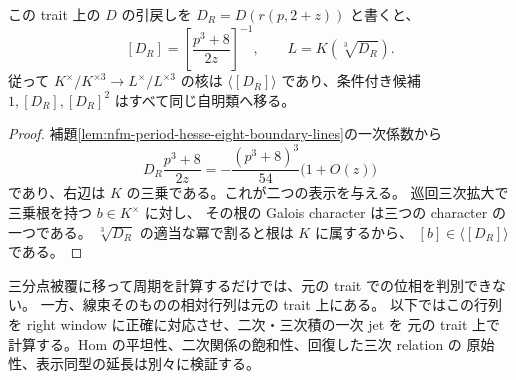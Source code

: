 \begin{corollary}[三分点被覆では境界位相の三候補を区別できない]
\label{cor:nfm-hesse-boundary-period-candidates-blind}
この trait 上の $D$ の引戻しを $D_R=D(r(p,2+z))$ と書くと、
\[
 [D_R]=\left[\frac{p^3+8}{2z}\right]^{-1},
 \qquad L=K(\sqrt[3]{D_R}).
\]
従って $K^\times/K^{\times3}\to L^\times/L^{\times3}$ の核は
$\langle[D_R]\rangle$ であり、条件付き候補 $1,[D_R],[D_R]^2$ はすべて同じ自明類へ移る。
\end{corollary}
\begin{proof}
補題\ref{lem:nfm-period-hesse-eight-boundary-lines}の一次係数から
\[
 D_R\frac{p^3+8}{2z}
    =-\frac{(p^3+8)^3}{54}\bigl(1+O(z)\bigr)
\]
であり、右辺は $K$ の三乗である。これが二つの表示を与える。
巡回三次拡大で三乗根を持つ $b\in K^\times$ に対し、
その根の Galois character は三つの character の一つである。
$\sqrt[3]{D_R}$ の適当な冪で割ると根は $K$ に属するから、
$[b]\in\langle[D_R]\rangle$ である。
\end{proof}

\begin{remark}[三分点被覆と境界計算の使い分け]
三分点被覆に移って周期を計算するだけでは、元の trait での位相を判別できない。
一方、線束そのものの相対行列は元の trait 上にある。
以下ではこの行列を right window に正確に対応させ、二次・三次積の一次 jet を
元の trait 上で計算する。Hom の平坦性、二次関係の飽和性、回復した三次 relation の
原始性、表示同型の延長は別々に検証する。
\end{remark}


